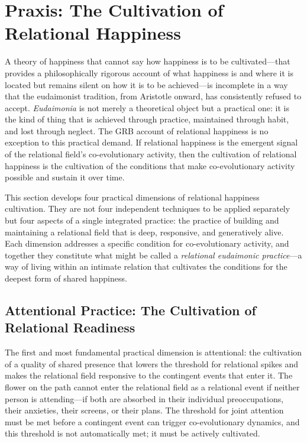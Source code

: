 \section{Praxis: The Cultivation of Relational Happiness}
\label{p14:sec:praxis}

\noindent
A theory of happiness that cannot say how happiness is to be cultivated---that provides a philosophically rigorous account of what happiness is and where it is located but remains silent on how it is to be achieved---is incomplete in a way that the eudaimonist tradition, from Aristotle onward, has consistently refused to accept. \emph{Eudaimonia} is not merely a theoretical object but a practical one: it is the kind of thing that is achieved through practice, maintained through habit, and lost through neglect. The GRB account of relational happiness is no exception to this practical demand. If relational happiness is the emergent signal of the relational field's co-evolutionary activity, then the cultivation of relational happiness is the cultivation of the conditions that make co-evolutionary activity possible and sustain it over time.

This section develops four practical dimensions of relational happiness cultivation. They are not four independent techniques to be applied separately but four aspects of a single integrated practice: the practice of building and maintaining a relational field that is deep, responsive, and generatively alive. Each dimension addresses a specific condition for co-evolutionary activity, and together they constitute what might be called a \emph{relational eudaimonic practice}---a way of living within an intimate relation that cultivates the conditions for the deepest form of shared happiness.

\subsection{Attentional Practice: The Cultivation of Relational Readiness}
\label{p14:subsec:attention}

\noindent
The first and most fundamental practical dimension is attentional: the cultivation of a quality of shared presence that lowers the threshold for relational spikes and makes the relational field responsive to the contingent events that enter it. The flower on the path cannot enter the relational field as a relational event if neither person is attending---if both are absorbed in their individual preoccupations, their anxieties, their screens, or their plans. The threshold for joint attention must be met before a contingent event can trigger co-evolutionary dynamics, and this threshold is not automatically met; it must be actively cultivated.


